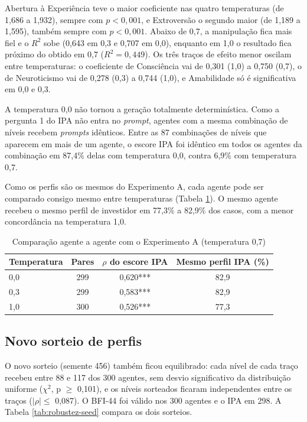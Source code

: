 Abertura à Experiência teve o maior coeficiente nas quatro temperaturas
(de 1,686 a 1,932), sempre com $p<0{,}001$, e Extroversão o segundo maior
(de 1,189 a 1,595), também sempre com $p<0{,}001$. Abaixo de 0,7, a
manipulação fica mais fiel e o $R^2$ sobe (0,643 em 0,3 e 0,707 em 0,0), enquanto em 1,0 o resultado fica
próximo do obtido em 0,7 ($R^2=0{,}449$). Os três traços de efeito menor
oscilam entre temperaturas: o coeficiente de Consciência vai de 0,301
(1,0) a 0,750 (0,7), o de Neuroticismo vai de 0,278 (0,3) a 0,744 (1,0),
e Amabilidade só é significativa em 0,0 e 0,3.

A temperatura 0,0 não tornou a geração totalmente determinística. Como a
pergunta 1 do IPA não entra no \textit{prompt}, agentes com a mesma
combinação de níveis recebem \textit{prompts} idênticos. Entre as 87
combinações de níveis que aparecem em mais de um agente, o escore IPA foi
idêntico em todos os agentes da combinação em 87,4\% delas com
temperatura 0,0, contra 6,9\% com temperatura 0,7.

Como os perfis são os mesmos do Experimento A, cada agente pode ser
comparado consigo mesmo entre temperaturas (Tabela
\ref{tab:robustez-temperatura-pareada}). O mesmo agente recebeu o mesmo
perfil de investidor em 77,3\% a 82,9\% dos casos, com a menor
concordância na temperatura 1,0.

\begin{table}[htb]
    \caption{Comparação agente a agente com o Experimento A (temperatura 0,7)}
    \label{tab:robustez-temperatura-pareada}
    \centering
    \begin{tabular}{lccc}
        \toprule
        Temperatura & Pares & $\rho$ do escore IPA & Mesmo perfil IPA (\%) \\
        \midrule
        0,0 & 299 & 0,620*** & 82,9 \\
        0,3 & 299 & 0,583*** & 82,9 \\
        1,0 & 300 & 0,526*** & 77,3 \\
        \bottomrule
    \end{tabular}
\end{table}

\subsection{Novo sorteio de perfis}

O novo sorteio (semente 456) também ficou equilibrado: cada nível de cada
traço recebeu entre 88 e 117 dos 300 agentes, sem desvio significativo da
distribuição uniforme ($\chi^2$, p $\geq$ 0,101), e os níveis sorteados
ficaram independentes entre os traços ($|\rho| \leq$ 0,087). O BFI-44 foi
válido nos 300 agentes e o IPA em 298. A Tabela \ref{tab:robustez-seed}
compara os dois sorteios.

